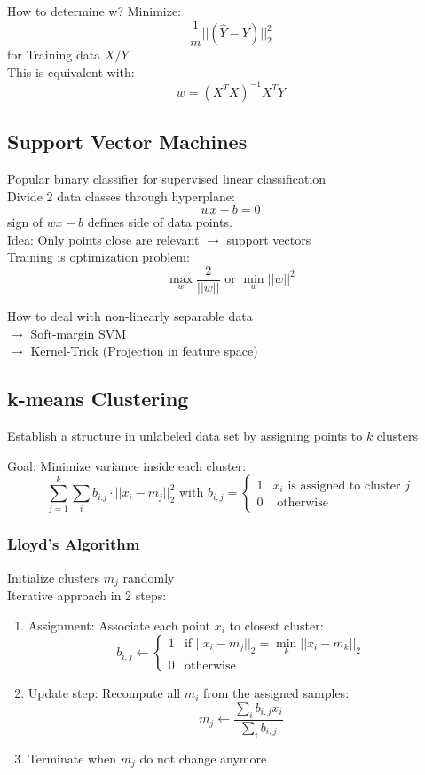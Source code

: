 How to determine w? Minimize:
\[\frac{1}{m} || (\hat{Y} - Y)||^2_2\]
for Training data \(X / Y\)\\

This is equivalent with:
\[ w = {(X^T X)}^{-1} X^T Y\]

\subsection{Support Vector Machines}%
\label{ml:sub:support_vector_machines}
Popular binary classifier for supervised linear classification\\
Divide 2 data classes through hyperplane:
\[wx - b = 0\]
sign of \(wx - b\) defines side of data points.\\

Idea: Only points close are relevant \(\rightarrow\) support vectors\\

Training is optimization problem:
\[\max_w \frac{2}{|| w ||} \text{ or } \min_w ||w||^2\]

How to deal with non-linearly separable data\\
\(\rightarrow\) Soft-margin SVM\\
\(\rightarrow\) Kernel-Trick (Projection in feature space)


\subsection{k-means Clustering}%
\label{ml:sub:k_means_clustering}
Establish a structure in unlabeled data set by assigning points to \(k\) clusters

Goal: Minimize variance inside each cluster:
\[
  \sum_{j=1}^k \sum_i b_{i.j} \cdot || x_i - m_j ||^2_2
  \text{ with } b_{i,j} = \begin{cases} 1 & x_i \text{ is assigned to cluster } j\\ 0 & \text{ otherwise}\end{cases}
\]


\subsubsection{Lloyd's Algorithm}%
\label{ml:ssub:lloyds_algorithm}
Initialize clusters \(m_j\) randomly\\
Iterative approach in 2 steps:
\begin{enumerate}
\item Assignment: Associate each point \(x_i\) to closest cluster:
  \[
    b_{i, j} \leftarrow \begin{cases}1 & \text{if } || x_i - m_j ||_2 = \min_k || x_i - m_k ||_2\\
      0 & \text{otherwise}\end{cases}
  \]
\item Update step: Recompute all \(m_i\) from the assigned samples:
  \[
    m_j \leftarrow \frac{\sum_i b_{i,j} x_i}{\sum_i b_{i,j}}
  \]
\item Terminate when \(m_j\) do not change anymore
\end{enumerate}

